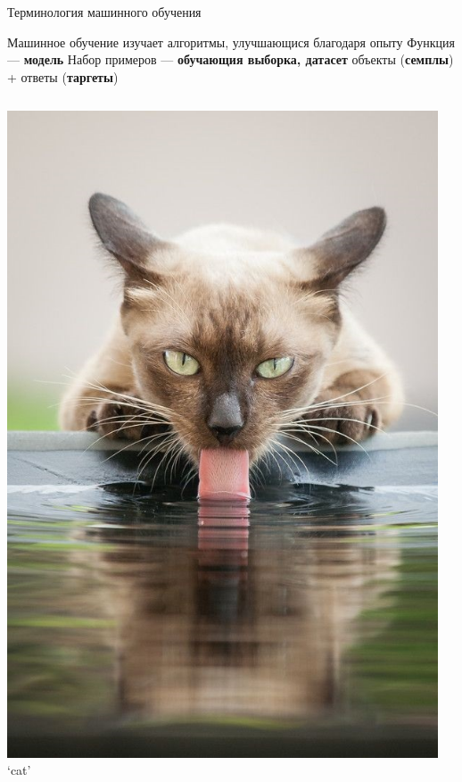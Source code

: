 \documentclass[aspectratio=169, professionalfonts]{beamer}
\begin{document}
\begin{frame}{Терминология машинного обучения}
    \begin{outline}
        \1 Машинное обучение изучает алгоритмы, улучшающися благодаря опыту
        \1 Функция --- \textbf{модель}
        \1 Набор примеров --- \textbf{обучающия выборка, датасет}
            \2 объекты (\textbf{семплы}) + ответы (\textbf{таргеты})
    \end{outline}
    \begin{columns}
        \begin{column}{.1\linewidth}
            \centering
            \includegraphics[width=\linewidth]{graphs/fig17_1.jpg}
            `cat'
        \end{column}
        \begin{column}{.1\linewidth}

\end{column}
\end{columns}
\end{frame}
\end{document}
